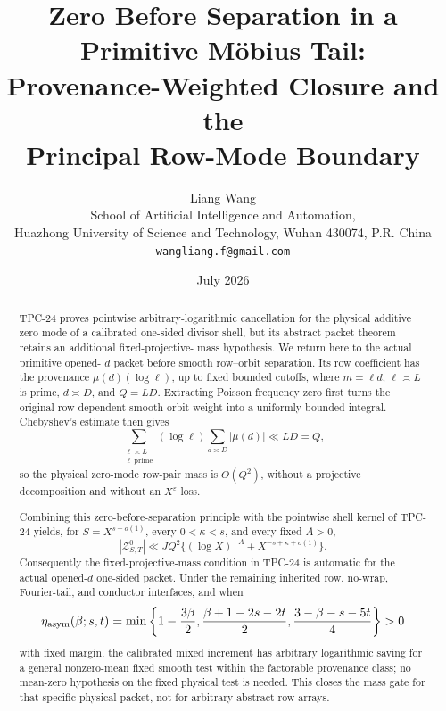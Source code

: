 \documentclass[11pt]{article}
\title{\textbf{Zero Before Separation in a Primitive M\"obius Tail:}\\
\textbf{Provenance-Weighted Closure and the}\\
\textbf{Principal Row-Mode Boundary}}
\author{Liang Wang\\
\small School of Artificial Intelligence and Automation,\\[-0.2em]
\small Huazhong University of Science and Technology, Wuhan 430074, P.R. China\\
\small \texttt{wangliang.f@gmail.com}}
\date{July 2026}
\theoremstyle{definition}
\theoremstyle{remark}
\begin{document}
\maketitle

\begin{abstract}
TPC-24 proves pointwise arbitrary-logarithmic cancellation for the
physical additive zero mode of a calibrated one-sided divisor shell,
but its abstract packet theorem retains an additional fixed-projective-
mass hypothesis.  We return here to the actual primitive opened-
\(d\) packet before smooth row--orbit separation.  Its row coefficient
has the provenance
\(\mu(d)(\log\ell)\), up to fixed bounded cutoffs, where
\(m=\ell d\), \(\ell\asymp L\) is prime, \(d\asymp D\), and
\(Q=LD\).  Extracting Poisson frequency zero first turns the original
row-dependent smooth orbit weight into a uniformly bounded integral.
Chebyshev's estimate then gives
\[
 \sum_{\substack{\ell\asymp L\\ \ell\ \mathrm{prime}}}
 (\log\ell)\sum_{d\asymp D}|\mu(d)|\ll LD=Q,
\]
so the physical zero-mode row-pair mass is \(O(Q^2)\), without a
projective decomposition and without an \(X^\varepsilon\) loss.

Combining this zero-before-separation principle with the pointwise shell
kernel of TPC-24 yields, for \(S=X^{s+o(1)}\), every
\(0<\kappa<s\), and every fixed \(A>0\),
\[
 |\mathcal Z^0_{S,T}|
 \ll JQ^2\{(\log X)^{-A}+X^{-s+\kappa+o(1)}\}.
\]
Consequently the fixed-projective-mass condition in TPC-24 is automatic
for the actual opened-\(d\) one-sided packet.  Under the remaining
inherited row, no-wrap, Fourier-tail, and conductor interfaces, and
when
\[
 \eta_{\rm asym}(\beta;s,t)=
 \min\left\{1-\frac{3\beta}{2},
 \frac{\beta+1-2s-2t}{2},
 \frac{3-\beta-s-5t}{4}\right\}>0
\]
with fixed margin, the calibrated mixed increment has arbitrary
logarithmic saving for a general nonzero-mean fixed smooth test within
the factorable provenance class; no mean-zero hypothesis on the fixed
physical test is needed.  This closes the mass gate for that
specific physical packet, not for arbitrary abstract row arrays.


\end{abstract}
\end{document}
